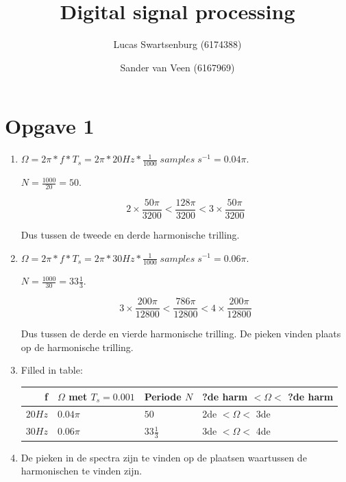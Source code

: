 \documentclass[10pt,a4paper]{article}
\title{Digital signal processing}
\author{Lucas Swartsenburg (6174388) \and Sander van Veen (6167969)}
\begin{document}
\maketitle


\newpage

\section*{Opgave 1} %
\label{sec:Opgave 1}

\begin{enumerate}
    \item $ \Omega = 2\pi * f * T_s = 2\pi * 20 Hz * \frac{1}{1000} \; samples
        \; s^{-1} = 0.04 \pi  $.

    \noindent $ N = \frac{1000}{20} = 50 $.

    \[ 2 \times \frac{50 \pi}{3200} < \frac{128 \pi}{3200} < 3 \times
    \frac{50 \pi}{3200} \]

    \noindent Dus tussen de tweede en derde harmonische trilling.

    \item $ \Omega = 2\pi * f * T_s = 2\pi * 30 Hz * \frac{1}{1000} \; samples
        \; s^{-1} = 0.06 \pi  $.

    \noindent $ N = \frac{1000}{30} = 33 \frac{1}{3} $.

    \[ 3 \times \frac{200 \pi}{12800} < \frac{786 \pi}{12800} < 4 \times
    \frac{200 \pi}{12800} \]

    \noindent Dus tussen de derde en vierde harmonische trilling.
    De pieken vinden plaats op de harmonische trilling.\\
    \item Filled in table:
    
    \begin{tabular}{|r|l|l|l|} \hline
        f & $\Omega$ met $T_s = 0.001$  & Periode $N$ & ?de harm $< \Omega<$ ?de
        harm \\ \hline
        $20 Hz$ & $0.04\pi$ & $50$ & 2de $< \Omega <$ 3de \\ \hline 
        $30 Hz$ & $0.06\pi$ & $33\frac{1}{3}$ & 3de $< \Omega <$ 4de \\ \hline 
    \end{tabular}
    \item De pieken in de spectra zijn te vinden op de plaatsen waartussen de harmonischen te vinden zijn.


\end{enumerate}
\end{document}
